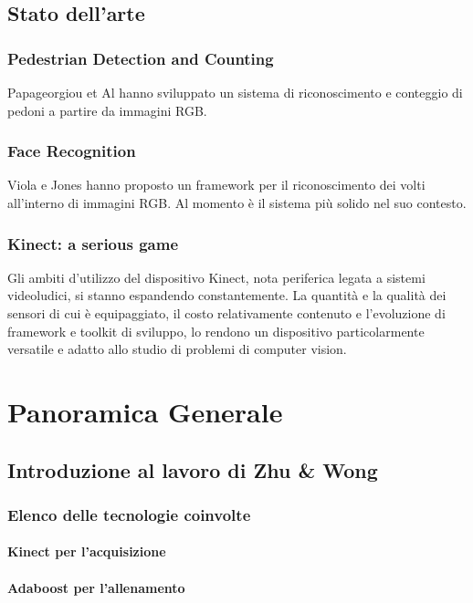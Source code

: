        \subsection{Stato dell'arte}
            \subsubsection{Pedestrian Detection and Counting}
            Papageorgiou et Al \cite{Papageorgiou98} hanno sviluppato un sistema di riconoscimento e conteggio di pedoni a partire da immagini RGB.
            \subsubsection{Face Recognition}
            Viola e Jones \cite{Viola04} hanno proposto un framework per il riconoscimento dei volti all'interno di immagini RGB. Al momento è il sistema più solido nel suo contesto.
            \subsubsection{Kinect: a serious game}
            Gli ambiti d'utilizzo del dispositivo Kinect, nota periferica legata a sistemi videoludici, si stanno espandendo constantemente. La quantità e la qualità dei sensori di cui è equipaggiato, il costo relativamente contenuto e l'evoluzione di framework e toolkit di sviluppo, lo rendono un dispositivo particolarmente versatile e adatto allo studio di problemi di computer vision.
    \section{Panoramica Generale}
    \label{sec:overview}
        \subsection{Introduzione al lavoro di Zhu & Wong}
            \subsubsection{Elenco delle tecnologie coinvolte}
                \paragraph{Kinect per l'acquisizione}
                \paragraph{Adaboost per l'allenamento}
